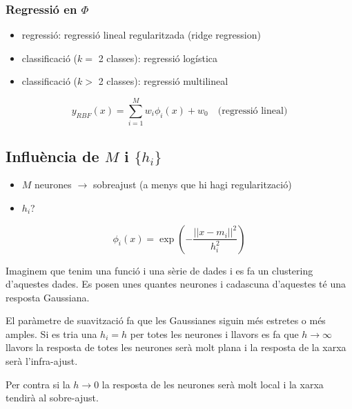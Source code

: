 \subsubsection{Regressió en $\Phi$}
\begin{itemize}
	\item regressió: regressió lineal regularitzada (ridge regression)
	\item classificació ($k=$ 2 classes): regressió logística
	\item classificació ($k>$ 2 classes): regressió multilineal
\end{itemize}

$$
y_{RBF}(x) = \sum_{i=1}^{M} w_i \phi_i(x) + w_0 \quad \text{(regressió lineal)}
$$

\subsection{Influència de $M$ i $\{h_i\}$}
\begin{itemize}
	\item $M$ neurones $\rightarrow$ sobreajust (a menys que hi hagi regularització)
	\item $h_i$?
\end{itemize}

$$
\phi_i(x) = \exp\left( - \frac{||x - m_i||^2}{h_i^2} \right)
$$

Imaginem que tenim una funció i una sèrie de dades i es fa un clustering d'aquestes dades. Es posen unes quantes neurones i cadascuna d'aquestes té una resposta Gaussiana. 

El paràmetre de suavització fa que les Gaussianes siguin més estretes o més amples. Si es tria una $h_i = h$ per totes les neurones i llavors es fa que $h \rightarrow \infty$ llavors la resposta de totes les neurones serà molt plana i la resposta de la xarxa serà l'infra-ajust.

Per contra si la $h \rightarrow 0$ la resposta de les neurones serà molt local i la xarxa tendirà al sobre-ajust.

